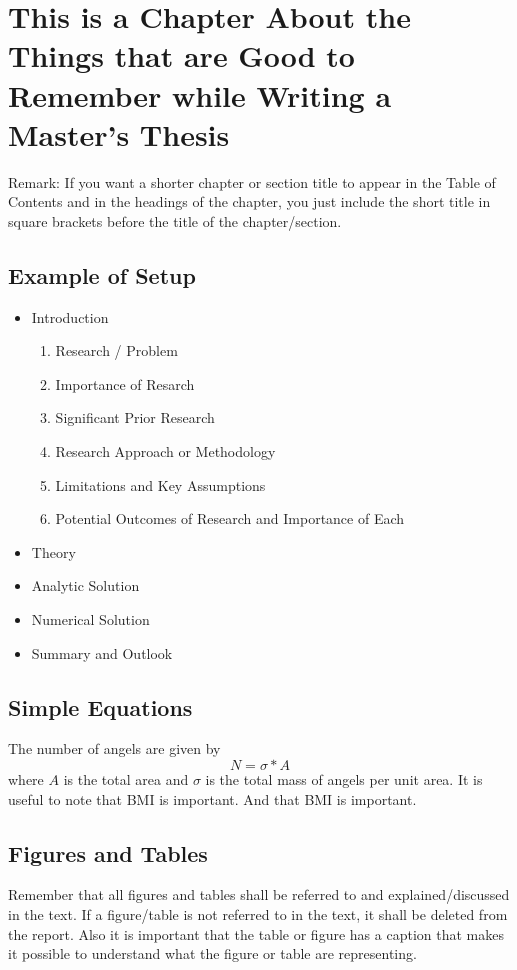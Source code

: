 \chapter[Good to Remember]{This is a Chapter About the Things that are Good to Remember while Writing a Master's Thesis}
Remark: If you want a shorter chapter or section title to appear in the Table of Contents and in the headings of the chapter, you just include the short title in square brackets before the title of the chapter/section.

\section{Example of Setup}
\begin{itemize}
\item Introduction
    \begin{enumerate}
    \item{Research / Problem}
    \item{Importance of Resarch}
    \item{Significant Prior Research}
    \item{Research Approach or Methodology}
    \item{Limitations and Key Assumptions}
    \item{Potential Outcomes of Research and Importance of Each}
    \end{enumerate}
\item{Theory}
\item{Analytic Solution}
\item{Numerical Solution}
\item{Summary and Outlook}
\end{itemize}

\section{Simple Equations}

The number of angels are given by
\begin{equation}
N = \sigma * A
\end{equation}
where $A$ is the total area and $\sigma$ is the total mass of angels per unit area. It is useful to note that \ac{BMI} is important. And that \ac{BMI} is important.

\section{Figures and Tables}
Remember that all figures and tables shall be referred to and explained/discussed in the text. If a figure/table is not referred to in the text, it shall be deleted from the report. Also it is important that the table or figure has a caption that makes it possible to understand what the figure or table are representing.

